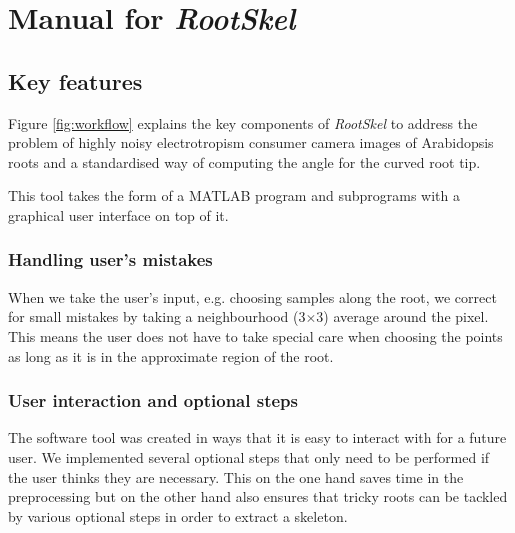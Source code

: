 \chapter{Manual for \textit{RootSkel}}\label{chp:manual}


\section{Key features} %

Figure \ref{fig:workflow} explains the key components of %
\textit{RootSkel} to address the problem of highly noisy electrotropism consumer camera images of Arabidopsis roots and a standardised way of computing the angle for the curved root tip. 

This tool takes the form of a MATLAB program and subprograms with a graphical user interface on top of it.

\subsection{Handling user's mistakes}

When we take the user's input, e.g. choosing samples along the root, we correct for small mistakes by taking a neighbourhood (3\(\times\)3) average around the pixel. 
This means the user does not have to take special care when choosing the points as long as it is in the approximate region of the root.

\subsection{User interaction and optional steps}
The software tool was created in ways that it is easy to interact with for a future user. 
We implemented several optional steps that only need to be performed if the user thinks they are necessary. This on the one hand saves time in the preprocessing but on the other hand also ensures that tricky roots can be tackled by various optional steps in order to extract a skeleton. 

